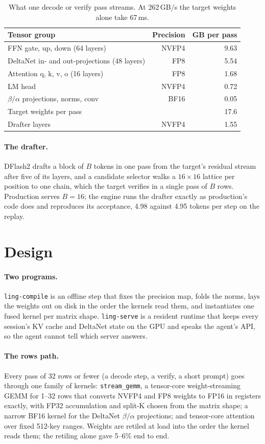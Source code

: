 \documentclass[11pt]{article}
\newcommand{\code}[1]{\texttt{#1}}
\begin{document}
\begin{table}[t]
\centering\small
\begin{tabular}{lrr}
\toprule
Tensor group & Precision & GB per pass \\
\midrule
FFN gate, up, down (64 layers) & NVFP4 & 9.63 \\
DeltaNet in- and out-projections (48 layers) & FP8 & 5.54 \\
Attention q, k, v, o (16 layers) & FP8 & 1.68 \\
LM head & NVFP4 & 0.72 \\
$\beta/\alpha$ projections, norms, conv & BF16 & 0.05 \\
\midrule
Target weights per pass & & 17.6 \\
Drafter layers & NVFP4 & 1.55 \\
\bottomrule
\end{tabular}
\caption{What one decode or verify pass streams. At 262\,GB/s the target weights alone take 67\,ms.}
\label{tab:bytes}
\end{table}

\paragraph{The drafter.}
DFlash2 drafts a block of $B$ tokens in one pass from the target's residual stream after five of its layers, and a
candidate selector walks a $16\times16$ lattice per position to one chain, which the target verifies in a single pass of
$B$ rows. Production serves $B=16$; the engine runs the drafter exactly as production's code does and reproduces its
acceptance, 4.98 against 4.95 tokens per step on the replay.

\section{Design}

\paragraph{Two programs.}
\code{ling-compile} is an offline step that fixes the precision map, folds the norms, lays the weights out on disk in the
order the kernels read them, and instantiates one fused kernel per matrix shape. \code{ling-serve} is a resident runtime
that keeps every session's KV cache and DeltaNet state on the GPU and speaks the agent's API, so the agent cannot tell
which server answers.

\paragraph{The rows path.}
Every pass of 32 rows or fewer (a decode step, a verify, a short prompt) goes through one family of kernels:
\code{stream\_gemm}, a tensor-core weight-streaming GEMM for 1--32 rows that converts NVFP4 and FP8 weights to FP16 in
registers exactly, with FP32 accumulation and split-K chosen from the matrix shape; a narrow BF16 kernel for the DeltaNet
$\beta/\alpha$ projections; and tensor-core attention over fixed 512-key ranges. Weights are retiled at load into the order
the kernel reads them; the retiling alone gave 5--6\% end to end.
\end{document}
